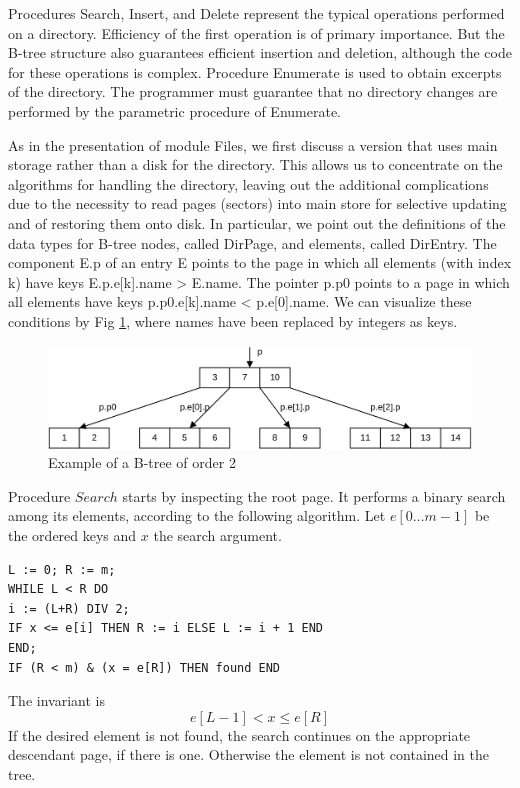Procedures Search, Insert, and Delete represent the typical operations performed on a directory.
Efficiency of the first operation is of primary importance. But the B-tree structure also guarantees
efficient insertion and deletion, although the code for these operations is complex. Procedure
Enumerate is used to obtain excerpts of the directory. The programmer must guarantee that no
directory changes are performed by the parametric procedure of Enumerate.

As in the presentation of module Files, we first discuss a version that uses main storage rather
than a disk for the directory. This allows us to concentrate on the algorithms for handling the
directory, leaving out the additional complications due to the necessity to read pages (sectors)
into main store for selective updating and of restoring them onto disk. In particular, we point out
the definitions of the data types for B-tree nodes, called DirPage, and elements, called DirEntry.
The component E.p of an entry E points to the page in which all elements (with index k) have
keys E.p.e[k].name > E.name. The pointer p.p0 points to a page in which all elements have keys
p.p0.e[k].name < p.e[0].name. We can visualize these conditions by Fig \ref{fig:b-tree}, where names have
been replaced by integers as keys.
\begin{figure}
	\label{fig:b-tree}
	\centering
	\includegraphics[width=\textwidth]{i/n}
	\caption{Example of a B-tree of order 2}
\end{figure}

Procedure $Search$ starts by inspecting the root page. It performs a binary search among its
elements, according to the following algorithm. Let $e[0 \dots m-1]$ be the ordered keys and $x$ the
search argument.
\begin{verbatim}
L := 0; R := m;
WHILE L < R DO
i := (L+R) DIV 2;
IF x <= e[i] THEN R := i ELSE L := i + 1 END
END;
IF (R < m) & (x = e[R]) THEN found END
\end{verbatim}

The invariant is
\[ e[L-1] < x \leq e[R] \]
If the desired element is not found, the search continues on the appropriate descendant page, if
there is one. Otherwise the element is not contained in the tree.

